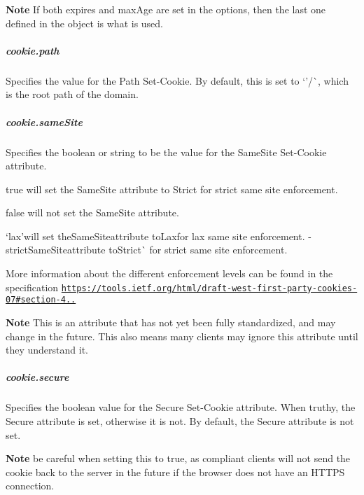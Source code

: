 {\bfseries Note} If both {\ttfamily expires} and {\ttfamily max\+Age} are set in the options, then the last one defined in the object is what is used.

\subparagraph*{cookie.\+path}

Specifies the value for the {\ttfamily Path} {\ttfamily Set-\/\+Cookie}. By default, this is set to `'/\textquotesingle{}\`{}, which is the root path of the domain.

\subparagraph*{cookie.\+same\+Site}

Specifies the {\ttfamily boolean} or {\ttfamily string} to be the value for the {\ttfamily Same\+Site} {\ttfamily Set-\/\+Cookie} attribute.


\begin{DoxyItemize}
\item {\ttfamily true} will set the {\ttfamily Same\+Site} attribute to {\ttfamily Strict} for strict same site enforcement.
\item {\ttfamily false} will not set the {\ttfamily Same\+Site} attribute.
\item `\textquotesingle{}lax'{\ttfamily will set the}Same\+Site{\ttfamily attribute to}Lax{\ttfamily for lax same site enforcement. -\/}\textquotesingle{}strictSame\+Site{\ttfamily attribute to}Strict\`{} for strict same site enforcement.
\end{DoxyItemize}

More information about the different enforcement levels can be found in the specification \href{https://tools.ietf.org/html/draft-west-first-party-cookies-07#section-4.1.1}{\tt https\+://tools.\+ietf.\+org/html/draft-\/west-\/first-\/party-\/cookies-\/07\#section-\/4..}

{\bfseries Note} This is an attribute that has not yet been fully standardized, and may change in the future. This also means many clients may ignore this attribute until they understand it.

\subparagraph*{cookie.\+secure}

Specifies the {\ttfamily boolean} value for the {\ttfamily Secure} {\ttfamily Set-\/\+Cookie} attribute. When truthy, the {\ttfamily Secure} attribute is set, otherwise it is not. By default, the {\ttfamily Secure} attribute is not set.

{\bfseries Note} be careful when setting this to {\ttfamily true}, as compliant clients will not send the cookie back to the server in the future if the browser does not have an H\+T\+T\+PS connection.

